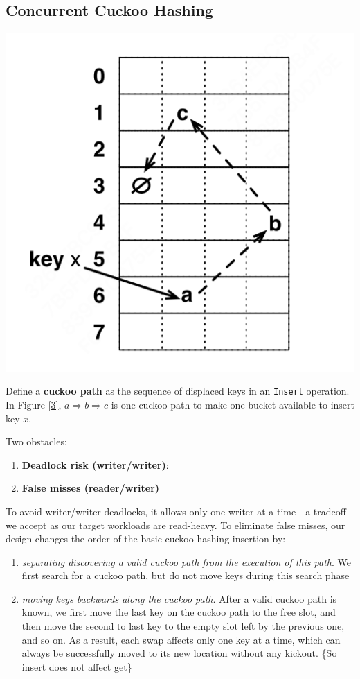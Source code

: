\documentclass[11pt]{article}
\begin{document}
\subsection{Concurrent Cuckoo Hashing}
\label{sec:org7ed4236}
\begin{center}
\includegraphics[width=.7\textwidth]{../../images/papers/176.png}
\end{center}

Define a \textbf{cuckoo path} as the sequence of displaced keys in an \texttt{Insert} operation. In Figure \ref{3},
\(a\Rightarrow b\Rightarrow c\) is one cuckoo path to make one bucket available to insert key \(x\).

Two obstacles:
\begin{enumerate}
\item \textbf{Deadlock risk (writer/writer)}:
\item \textbf{False misses (reader/writer)}
\end{enumerate}

To avoid writer/writer deadlocks, it allows only one writer at a time - a tradeoff we accept as our
target workloads are read-heavy. To eliminate false misses, our design changes the order of the basic
cuckoo hashing insertion by:
\begin{enumerate}
\item \emph{separating discovering a valid cuckoo path from the execution of this path}. We first search for a
cuckoo path, but do not move keys during this search phase
\item \emph{moving keys backwards along the cuckoo path}. After a valid cuckoo path is known, we first move the
last key on the cuckoo path to the free slot, and then move the second to last key to the empty
slot left by the previous one, and so on. As a result, each swap affects only one key at a time,
which can always be successfully moved to its new location without any kickout. \wu\{So insert does
not affect get\}
\end{enumerate}
\end{document}
